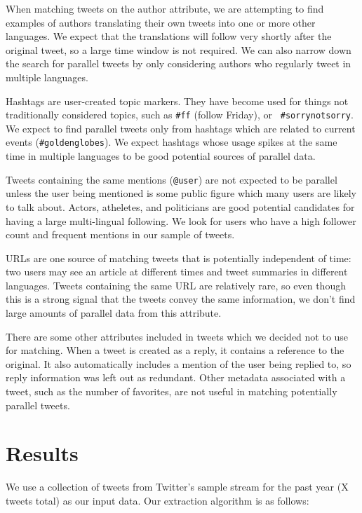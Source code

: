 \documentclass[11pt,letterpaper]{article}
\begin{document}
When matching tweets on the author attribute, we are attempting to find examples
of authors translating their own tweets into one or more other languages. We
expect that the translations will follow very shortly after the original tweet,
so a large time window is not required. We can also narrow down the search for
parallel tweets by only considering authors who regularly tweet in multiple
languages.

Hashtags are user-created topic markers. They have become used for things not
traditionally considered topics, such as {\tt \#ff} (follow Friday), or {\tt
\#sorrynotsorry}. We expect to find parallel tweets only from hashtags which
are related to current events ({\tt \#goldenglobes}).
We expect hashtags whose usage spikes at the same time in multiple languages to
be good potential sources of parallel data.

Tweets containing the same mentions ({\tt @user}) are not expected to be
parallel unless the user being mentioned is some public figure which many users
are likely to talk about. Actors, atheletes, and politicians are good potential
candidates for having a large multi-lingual following. We look for users who
have a high follower count and frequent mentions in our sample of tweets.

URLs are one source of matching tweets that is potentially independent of time:
two users may see an article at different times and tweet summaries in different
languages. Tweets containing the same URL are relatively rare, so even though
this is a strong signal that the tweets convey the same information, we don't
find large amounts of parallel data from this attribute.

There are some other attributes included in tweets which we decided not to use
for matching. When a tweet is created as a reply, it contains a reference to the
original. It also automatically includes a mention of the user being replied to,
so reply information was left out as redundant. Other metadata associated with a
tweet, such as the number of favorites, are not useful in matching potentially
parallel tweets.


\section{Results}
We use a collection of tweets from Twitter's sample stream for the past year (X
tweets total) as our input data. Our extraction algorithm is as follows:
\end{document}
